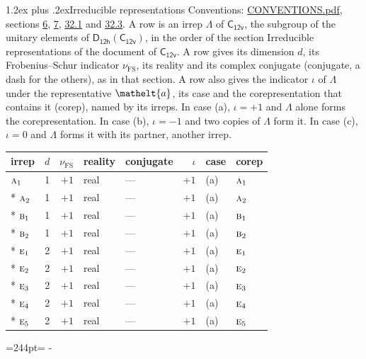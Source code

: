 \documentclass[10pt,a4paper]{article}
\makeatletter
\renewcommand\section{\@startsection{section}{1}{\z@}{-3ex plus -1ex minus -.2ex}%
  {1.2ex plus .2ex}{\normalfont\large\sffamily\bfseries\color{parttitle}}}
\newcommand{\needspace}[1]{\par\penalty-100\begingroup\dimen0=#1\relax\dimen2=\pagegoal
  \advance\dimen2-\pagetotal\ifdim\dimen0>\dimen2\relax\ifdim\dimen2>0pt\vfil\break\fi\fi
  \endgroup}
\numberwithin{equation}{section}
\newcommand{\eltfont}[1]{{\let\sigma\eltsigma\mathelt{#1}}}
\newcommand{\grp}[1]{\mathsf{#1}}
\newcommand{\irr}[1]{\text{\normalfont\scshape #1}}
\newcommand{\elt}[1]{\eltfont{#1}}
\newcommand{\fsind}{\nu_{\mathrm{FS}}}
\makeatother
\begin{document}
\section{Irreducible representations}\label{s:irreps}
Conventions: \href{../../CONVENTIONS.pdf}{CONVENTIONS.pdf}, sections \href{../../../rotation/CONVENTIONS.pdf\#conv.6}{6}, \href{../../../rotation/CONVENTIONS.pdf\#conv.7}{7}, \href{../../CONVENTIONS.pdf\#conv.32.1}{32.1} and \href{../../CONVENTIONS.pdf\#conv.32.3}{32.3}.
\leavevmode\label{n:irrep.Delta}A row is an irrep $\Lambda$ of $\grp{C_{12v}}$, the subgroup of the unitary elements of $\grp{D_{12h}}(\grp{C_{12v}})$, in the order of the section Irreducible representations of the document of \href{../../../rotation/data/pdf/C12v.pdf}{$\grp{C_{12v}}$}. \label{n:index.dimension}\label{n:index.frobenius}\label{n:head.irrep}\label{n:head.reality}\label{n:head.conjugate}A row gives its dimension $d$, its Frobenius--Schur indicator $\fsind$, its reality and its complex conjugate (conjugate, a dash for the others), as in that section. \label{n:head.case.corep}\label{n:head.corep}A row also gives the indicator $\iota$ of $\Lambda$ under the representative $\elt{a}$, its case and the corepresentation that contains it (corep), named by its irreps. In case (a), $\iota = +1$ and $\Lambda$ alone forms the corepresentation. In case (b), $\iota = -1$ and two copies of $\Lambda$ form it. In case (c), $\iota = 0$ and $\Lambda$ forms it with its partner, another irrep.
\setlength{\emergencystretch}{2em}\par\setlength{\emergencystretch}{0pt}
{\small\renewcommand{\arraystretch}{1.25}\setlength{\tabcolsep}{4pt}\begin{longtable}{@{}lrrllrll@{}}\toprule
irrep & $d$ & $\fsind$ & reality & conjugate & $\iota$ & case & corep\\\midrule\endhead
\bottomrule\endfoot\endlastfoot
$\irr{a}_{1}$ & 1 & $+1$ & real & --- & $+1$ & (a) & $\irr{a}_{1}$\\*
$\irr{a}_{2}$ & 1 & $+1$ & real & --- & $+1$ & (a) & $\irr{a}_{2}$\\*
$\irr{b}_{1}$ & 1 & $+1$ & real & --- & $+1$ & (a) & $\irr{b}_{1}$\\*
$\irr{b}_{2}$ & 1 & $+1$ & real & --- & $+1$ & (a) & $\irr{b}_{2}$\\*
$\irr{e}_{1}$ & 2 & $+1$ & real & --- & $+1$ & (a) & $\irr{e}_{1}$\\*
$\irr{e}_{2}$ & 2 & $+1$ & real & --- & $+1$ & (a) & $\irr{e}_{2}$\\*
$\irr{e}_{3}$ & 2 & $+1$ & real & --- & $+1$ & (a) & $\irr{e}_{3}$\\*
$\irr{e}_{4}$ & 2 & $+1$ & real & --- & $+1$ & (a) & $\irr{e}_{4}$\\*
$\irr{e}_{5}$ & 2 & $+1$ & real & --- & $+1$ & (a) & $\irr{e}_{5}$\\
\bottomrule\end{longtable}}
\needspace{244pt}
\end{document}

